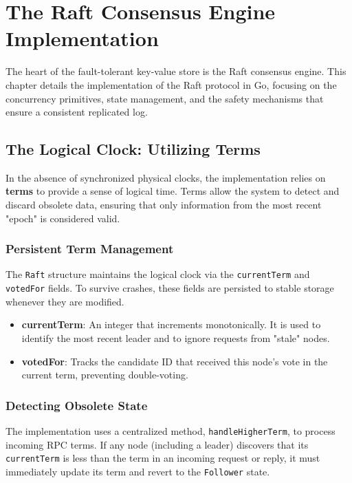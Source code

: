 \chapter{The Raft Consensus Engine Implementation}
\label{ch:raft_implementation}

The heart of the fault-tolerant key-value store is the Raft consensus engine. This chapter details the implementation of the Raft protocol in Go, focusing on the concurrency primitives, state management, and the safety mechanisms that ensure a consistent replicated log.

\section{The Logical Clock: Utilizing Terms}
In the absence of synchronized physical clocks, the implementation relies on \textbf{terms} to provide a sense of logical time. Terms allow the system to detect and discard obsolete data, ensuring that only information from the most recent "epoch" is considered valid.

\subsection{Persistent Term Management}
The \texttt{Raft} structure maintains the logical clock via the \texttt{currentTerm} and \texttt{votedFor} fields. To survive crashes, these fields are persisted to stable storage whenever they are modified.

\begin{itemize}
    \item \textbf{currentTerm}: An integer that increments monotonically. It is used to identify the most recent leader and to ignore requests from "stale" nodes.
    \item \textbf{votedFor}: Tracks the candidate ID that received this node's vote in the current term, preventing double-voting.
\end{itemize}

\subsection{Detecting Obsolete State}
The implementation uses a centralized method, \texttt{handleHigherTerm}, to process incoming RPC terms.
If any node (including a leader) discovers that its \texttt{currentTerm} is less than the term in an incoming request or reply, it must immediately update its term and revert to the \texttt{Follower} state.

